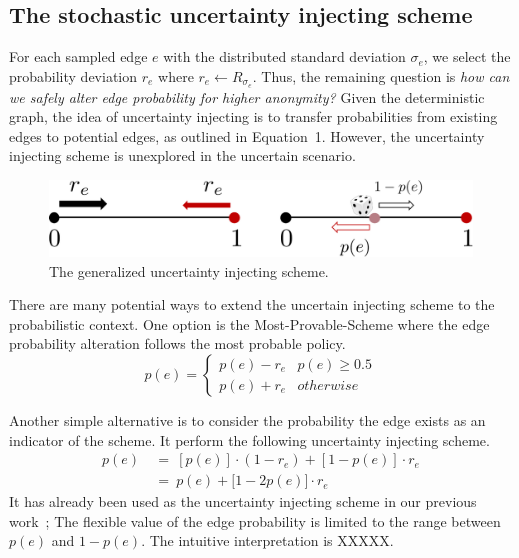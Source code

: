 \subsection{The stochastic uncertainty injecting scheme}
For each sampled edge $e$ with the distributed standard deviation $\sigma_{e}$, we select the probability deviation $r_{e}$ where $r_{e} \leftarrow R_{\sigma_{e}}$. 
Thus, the remaining question is \emph{how can we safely alter edge probability for higher anonymity?}
Given the deterministic graph, the idea of uncertainty injecting is to transfer probabilities from existing edges to potential edges, as outlined in Equation~1.
However, the uncertainty injecting scheme is unexplored in the uncertain scenario.  
 

\begin{figure}[!htb]
  \vspace{-2pt}
  \centering
        \includegraphics[width=\linewidth]{ill/shift_UI.pdf}
    \caption{The generalized uncertainty injecting scheme.}
    \vspace{-10pt}
\end{figure}
There are many potential ways to extend the uncertain injecting scheme to the probabilistic context.   
One option is the Most-Provable-Scheme where the edge probability alteration follows the most probable policy.
\begin{equation*}
  p(e) =
  \begin{cases}
     p(e)-r_{e}    & p(e) \ge 0.5 \\
     p(e)+r_{e}    & otherwise 
  \end{cases}
  \label{eq:inject}
\end{equation*}

Another simple alternative is to consider the probability the edge exists as an indicator of the scheme. 
It perform the following uncertainty injecting scheme.
\begin{align}
  p(e)~&=~ [p(e)] \cdot (1-r_{e})+ [1-p(e)] \cdot r_{e} \\
      ~&=~ p(e) + \big[ 1- 2 p(e) \big] \cdot r_{e}
  \label{eq:ui}
\end{align}
It has already been used as the uncertainty injecting scheme in our previous work~\cite{Xiao:2018}; 
The flexible value of the edge probability is limited to the range between $p(e)$ and $1-p(e)$.
The intuitive interpretation is XXXXX. 

